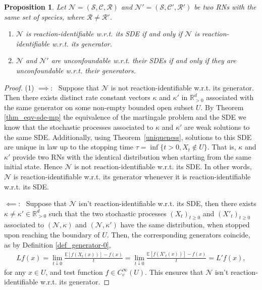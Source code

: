 \documentclass[10pt,a4paper]{amsart}
\newtheorem{proposition}[theorem]{Proposition}
\theoremstyle{definition}
\theoremstyle{remark}
\theoremstyle{consequence}
\def\cN{\mathcal{N}}
\def\cR{\mathcal{R}}
\def\cS{\mathcal{S}}
\def\cC{\mathcal{C}}
\def\R{\mathbb{R}}
\numberwithin{equation}{section}
\begin{document}
\begin{proposition}
Let $\cN = (\cS, \cC, \cR)$ and $\cN' = (\cS, \cC', \cR')$ be two RNs with the same set of species, where $\cR \neq \cR'$.

\begin{enumerate}
\item $\cN$ is reaction-identifiable w.r.t. its SDE if and only if $\cN$ is reaction-identifiable w.r.t. its generator.

\item $\cN$ and $\cN'$ are unconfoundable w.r.t. their SDEs if and only if they are unconfoundable w.r.t. their generators.
\end{enumerate}

\end{proposition}
\begin{proof}
(1) $\implies$:~
Suppose that $\cN$ is not reaction-identifiable w.r.t. its generator. Then there exists distinct rate constant vectors $\kappa$ and $\kappa'$  in  $\R^{d}_{>0}$ associated with the same generator on some non-empty bounded open subset $U$. By Theorem \ref{thm_eqv-sde-mp} \textemdash the equivalence of the martingale problem and the SDE \textemdash we know that the stochastic processes
associated to $\kappa$ and $\kappa'$
are weak solutions to the same SDE. Additionally, using Theorem~\ref{uniqueness}, solutions to this SDE are unique in law up to the stopping time $\tau = \inf\{t > 0, X_{t} \notin U\}$. That is, $\kappa$ and $\kappa'$ provide two RNs with the identical distribution when starting from the same initial state. Hence $\cN$ is not reaction-identifiable w.r.t. its SDE. In other words, $\cN$ is reaction-identifiable w.r.t. its generator whenever it is reaction-identifiable w.r.t. its SDE.

$\impliedby$:~
 Suppose that $\cN$ isn't reaction-identifiable w.r.t. its SDE, then there exists $\kappa \neq  \kappa' \in \R^{d}_{>0}$ such that the two stochastic processes $(X_t)_{t \geq 0}$ and $(X'_t)_{t \geq 0}$ associated to $(\cN,\kappa)$ and $(\cN,\kappa')$ have the same distribution, when stopped upon reaching the boundary of $U$. Then, the corresponding generators coincide,
as by Definition \ref{def_generator-0},
 \begin{align}\label{eq_L=L'}
  L f(x) = \lim_{t \downarrow 0}\frac{\mathbb{E} [f(X_t (x))] - f(x)}{t} = \lim_{t \downarrow 0}\frac{\mathbb{E} [f(X'_t (x))] - f(x)}{t} = L' f(x),
\end{align}
for any $x \in U$, and  test function $f \in C_c^{\infty} (U)$. This ensures that $\cN$ isn't reaction-identifiable w.r.t. its generator. \medskip



\end{proof}
\end{document}
